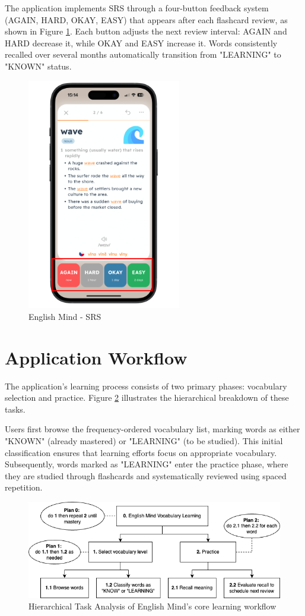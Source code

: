 The application implements SRS through a four-button feedback system (AGAIN, HARD, OKAY, EASY) that appears after each flashcard review, as shown in Figure \ref{fig:em-srs-flashcard}. Each button adjusts the next review interval: AGAIN and HARD decrease it, while OKAY and EASY increase it. Words consistently recalled over several months automatically transition from "LEARNING" to "KNOWN" status.

\begin{figure}[!h]
    \includegraphics[width=0.6\textwidth]{src/figures/em-srs-flashcard.png}
    \caption{English Mind - SRS}
    \label{fig:em-srs-flashcard}
\end{figure}

\section{Application Workflow}

The application's learning process consists of two primary phases: vocabulary selection and practice. Figure \ref{fig:em-hta} illustrates the hierarchical breakdown of these tasks.

Users first browse the frequency-ordered vocabulary list, marking words as either "KNOWN" (already mastered) or "LEARNING" (to be studied). This initial classification ensures that learning efforts focus on appropriate vocabulary. Subsequently, words marked as "LEARNING" enter the practice phase, where they are studied through flashcards and systematically reviewed using spaced repetition.

\vspace{1cm}

\begin{figure}[!h]
    \includegraphics[width=1\textwidth]{src/figures/english_mind_workflow_THA.png}
    \caption{Hierarchical Task Analysis of English Mind's core learning workflow}
    \label{fig:em-hta}
\end{figure}

